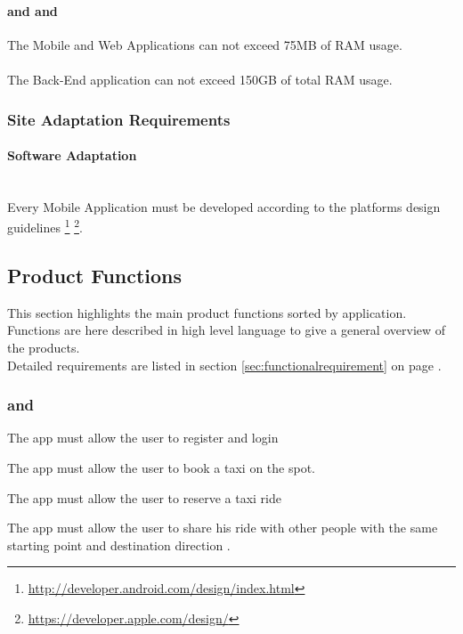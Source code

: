 \label{ssub:memory_constrains}
\paragraph{ and  and  }
The Mobile and Web Applications can not exceed 75MB of RAM usage.
\paragraph{}
The Back-End application can not exceed 150GB of total RAM usage.

\subsubsection{Site Adaptation Requirements} 
\label{ssub:site_adaptation_requirements}
\paragraph{Software Adaptation} \mbox{} \\
Every Mobile Application must be developed according to the platforms design guidelines \footnote{\url{http://developer.android.com/design/index.html}} \footnote{\url{https://developer.apple.com/design/}}.

\subsection{Product Functions} 
\label{sub:product_functions}
This section highlights the main product functions sorted by application.\\
Functions are here described in high level language to give a general overview of the products.\\
Detailed requirements are listed in section \ref{sec:functionalrequirement} on page \pageref{sec:functionalrequirement}.

\subsubsection{ and }
\label{ssub:web_application_and_mobile_application_}
\begin{enumerate} [label = \textbf{[F\arabic*]}]
	\item The app must allow the user to register and login
	\item  The app must allow the user to book a taxi on the spot.
	\item  The app must allow the user to reserve a taxi ride
	\item  The app must allow the user to share his ride with other people with the same starting point and destination direction .
\end{enumerate}

